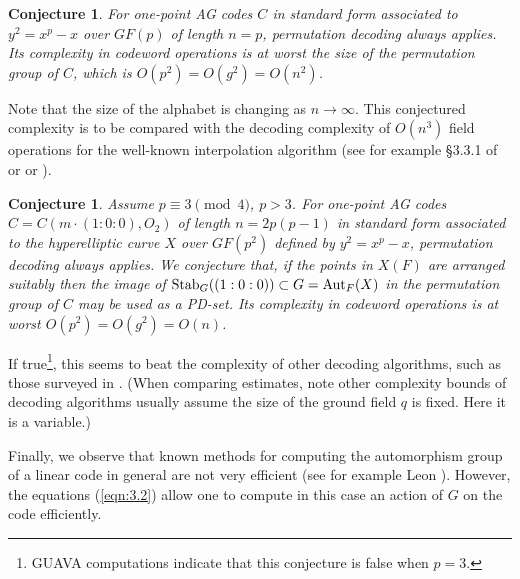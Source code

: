 \documentclass[12pt]{article}
\newtheorem{conjecture}[theorem]{Conjecture}
\numberwithin{equation}{section}
\def\Aut{{\rm{Aut}}}
\def\Stab{{\rm{Stab}}}
\begin{document}
\begin{conjecture} 
\label{conj:1}
For one-point AG codes $C$ 
in standard form associated
to $y^2=x^p-x$ over $GF(p)$ of length $n=p$,
permutation decoding always applies.
Its complexity in codeword operations is
at worst the size of the permutation group of $C$, 
which is $O(p^2)=O(g^2)=O(n^2)$.
\end{conjecture}

Note that the size of the alphabet is changing 
as $n\rightarrow \infty$. This conjectured complexity
is to be compared with the 
decoding complexity of $O(n^3)$ field operations 
for the well-known interpolation algorithm 
(see for example \S 3.3.1 of \cite{TV} or \cite{Sti}
or \cite{HvLP}).

\begin{conjecture}
\label{conj:2}
Assume $p\equiv 3\pmod 4$, $p>3$.
For one-point AG codes $C=C(m\cdot (1:0:0),O_2)$ 
of length $n=2p(p-1)$ in standard form associated
to the hyperelliptic curve $X$ over $GF(p^2)$ defined
by $y^2=x^p-x$, permutation decoding always applies.
We conjecture that, if the points
in $X(F)$ are arranged suitably then the image of 
$\Stab_G((1:0:0))\subset G=\Aut_F(X)$ 
in the permutation group of $C$ may be used
as a PD-set. Its complexity in codeword operations is
at worst $O(p^2)=O(g^2)=O(n)$.
\end{conjecture}

If true\footnote{GUAVA computations indicate that this
conjecture is false when $p=3$.}, 
this seems to beat the complexity of other
decoding algorithms, such as those surveyed
in \cite{HvLP}. 
(When comparing estimates, note other complexity 
bounds of decoding algorithms usually assume 
the size of the ground field $q$ is fixed. Here it is a
variable.)

Finally, we observe that known methods for 
computing the automorphism group of a linear code 
in general are
not very efficient (see for example Leon \cite{L}).
However, the equations (\ref{eqn:3.2}) 
allow one to compute in this case an action
of $G$ on the code efficiently.
\end{document}
